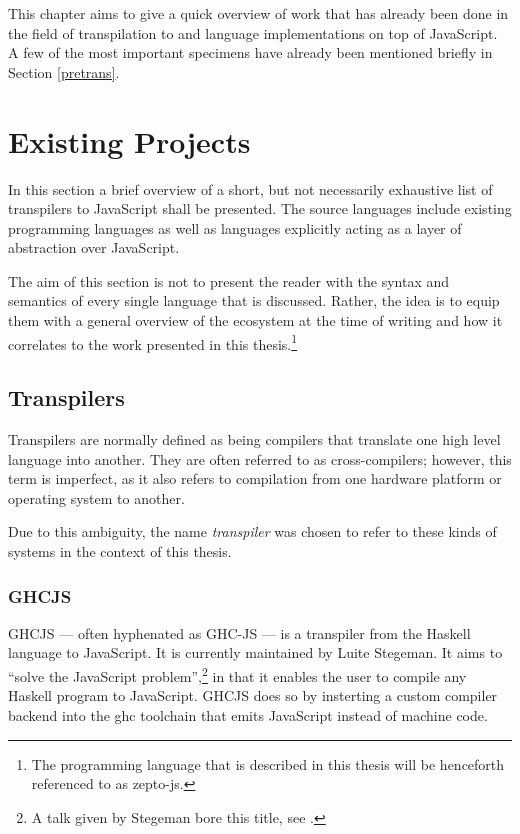 \documentclass[oneside,11pt,xetex]{scrbook}
\begin{document}
This chapter aims to give a quick overview of work that has already been done in the
field of transpilation to and language implementations on top of JavaScript. A few
of the most important specimens have already been mentioned briefly in Section \ref{pretrans}.

\section{Existing Projects}

In this section a brief overview of a short, but not necessarily exhaustive list of
transpilers to JavaScript shall be presented. The source languages include
existing programming languages as well as languages explicitly acting as
a layer of abstraction over JavaScript.

The aim of this section is not to present the reader with the syntax and semantics
of every single language that is discussed. Rather, the idea is to equip them with a
general overview of the ecosystem at the time of writing and how it correlates to
the work presented in this thesis.\footnote{The programming language that is described
in this thesis will be henceforth referenced to as zepto-js.}

\subsection{Transpilers}
\label{trans}

Transpilers are normally defined as being compilers that translate one high level language
into another. They are often referred to as cross-compilers; however, this term is imperfect,
as it also refers to compilation from one hardware platform or operating system to
another.

Due to this ambiguity, the name \textit{transpiler} was chosen to refer to these
kinds of systems in the context of this thesis.

\subsubsection{GHCJS}
\label{sec:GHCJS}

GHCJS --- often hyphenated as GHC-JS --- is a transpiler from the Haskell language
to JavaScript. It is currently maintained by Luite Stegeman. It aims to ``solve
the JavaScript problem'',\footnote{A talk given by Stegeman bore this title, see
\parencite{STEG}.} in that it enables the user to compile any Haskell program to JavaScript.
GHCJS does so by insterting a custom compiler backend into the \gls{ghc} toolchain
that emits JavaScript instead of machine code.
\end{document}
